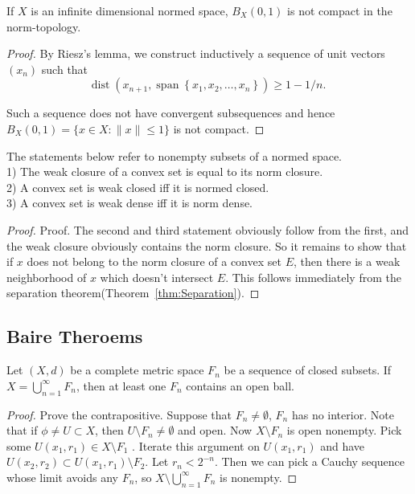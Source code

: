 \begin{corollary}
	\label{cor:InfiniteDimUnitBall}
	If $X$ is an infinite dimensional normed space, $B_X(0,1)$ is not compact in the norm-topology.
\end{corollary}
\begin{proof}
	By Riesz's lemma, we construct inductively a sequence of unit vectors $\left(x_n\right)$ such that
\[
\operatorname{dist}\left(x_{n+1}, \operatorname{span}\left\{x_1, x_2, \ldots, x_n\right\}\right) \geqslant 1-1 / n \text {. }
\]

Such a sequence does not have convergent subsequences and hence $B_X(0,1)=\{x \in X:\|x\| \leqslant 1\}$ is not compact.
\end{proof}

\begin{theorem}
	\label{thm:LCSClosure}
	The statements below refer to nonempty subsets of a normed space.\\
1) The weak closure of a convex set is equal to its norm closure.\\
2) A convex set is weak closed iff it is normed closed.\\
3) A convex set is weak dense iff it is norm dense.
\end{theorem}
\begin{proof}
	Proof. The second and third statement obviously follow from the first, and the weak closure obviously contains the norm closure. So it remains to show that if $x$ does not belong to the norm closure of a convex set $E$, then there is a weak neighborhood of $x$ which doesn't intersect $E$. This follows immediately from the separation theorem(Theorem~\ref{thm:Separation}).
\end{proof}







\subsection{Baire Theroems}

\begin{theorem}
	\label{thm:Baire}
	Let $(X, d)$ be a complete metric space $F_n$ be a sequence of closed subsets. If $X = \bigcup_{n = 1 }^\infty F_n $, then at least one $F_n$ contains an open ball.
\end{theorem}
\begin{proof}
	Prove the contrapositive. Suppose that $F_n\neq \emptyset $, $F_n$ has no interior. Note that if $\phi\neq U \subset X$, then $U \setminus F_n \neq \emptyset $ and open. Now $X \setminus F_n$ is open nonempty. Pick some $U(x_1, r_1) \in X \setminus F_1$ . Iterate this argument on $U(x_1, r_1)$ and have $U(x_2, r_2) \subset U(x_1, r_1) \setminus F_2$. Let $r_n < 2^{- n}$. Then we can pick a Cauchy sequence whose limit avoids any $F_n$, so $X \setminus \bigcup_{n = 1} ^\infty F_n$ is nonempty.
\end{proof}

